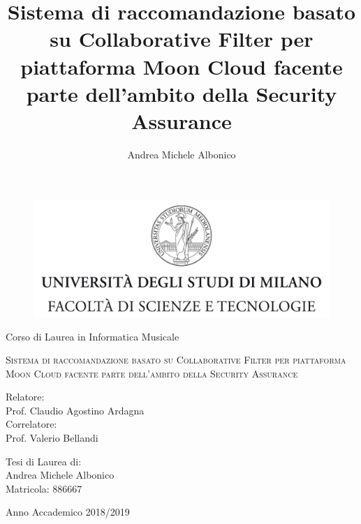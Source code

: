 \documentclass[12pt,fleqn,twoside,a4paper]{book}
\title{Sistema di raccomandazione basato su Collaborative Filter per piattaforma Moon Cloud 
facente parte dell'ambito della Security Assurance}
\author{Andrea Michele Albonico}
\begin{document}
\frontmatter

\begin{titlepage}
    \begin{figure}
        \centering
        \includegraphics[height=5.0 cm]{logo.jpg}
        \vspace{0.5 cm}
    \end{figure}
    \begin{center}
        {\Large Corso di Laurea in Informatica Musicale}
    \end{center}
    \begin{center}
        \vspace{2 cm}
        {\Large \textsc{Sistema di raccomandazione basato su Collaborative Filter per piattaforma Moon Cloud 
        facente parte dell'ambito della Security Assurance} }
    \end{center}
    \par
    \vspace{2 cm}
    \begin{flushleft}
        Relatore:\\ Prof. Claudio Agostino Ardagna\\
        \noindent Correlatore:\\ Prof. Valerio Bellandi
    \end{flushleft}
    \vspace{1 cm}
    \begin{flushright}
        Tesi di Laurea di:\\ Andrea Michele Albonico\\ Matricola: 886667
    \end{flushright}
    \vfill
    \begin{center}
        {\Large Anno Accademico 2018/2019}
    \end{center}
\end{titlepage}

\break




\end{document}
